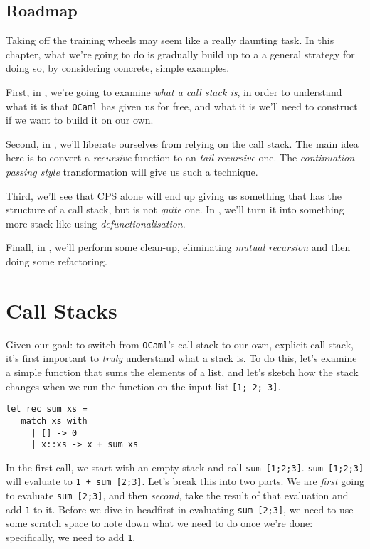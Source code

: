 \subsection{Roadmap}
Taking off the training wheels may seem like a really daunting task. In this chapter, what we're going to do is gradually build up to a  a general strategy for doing so, by considering concrete, simple examples.

First, in , we're going to examine \emph{what a call stack is}, in order to understand what it is that \texttt{OCaml} has given us for free, and what it is we'll need to construct if we want to build it on our own.

Second, in , we'll liberate ourselves from relying on the call stack. The main idea here is to convert a \emph{recursive} function to an \emph{tail-recursive} one. The \emph{continuation-passing style} transformation will give us such a technique.

Third, we'll see that CPS alone will end up giving us something that has the structure of a call stack, but is not \emph{quite} one. In , we'll turn it into something more stack like using \emph{defunctionalisation}. 

Finall, in , we'll perform some clean-up, eliminating \emph{mutual recursion} and then doing some refactoring. 



\section{Call Stacks}\label{section:call-stacks}
Given our goal: to switch from \texttt{OCaml}'s call stack to our own, explicit call stack, it's first important to \emph{truly} understand what a stack is. To do this, let's examine a simple function that sums the elements of a list, and let's sketch how the stack changes when we run the function on the input list \texttt{[1; 2; 3]}.

\begin{code}
\label{code:sum-ocaml}
\begin{verbatim}
let rec sum xs = 
   match xs with
     | [] -> 0
     | x::xs -> x + sum xs
\end{verbatim}
\end{code}

In the first call, we start with an empty stack and call \texttt{sum [1;2;3]}. \texttt{sum [1;2;3]} will evaluate to \texttt{1 + sum [2;3]}. Let's break this into two parts. We are \emph{first} going to evaluate \texttt{sum [2;3]}, and then \emph{second}, take the result of that evaluation and add \texttt{1} to it. Before we dive in headfirst in evaluating \texttt{sum [2;3]}, we need to use some scratch space to note down what we need to do once we're done: specifically, we need to add \texttt{1}. 

